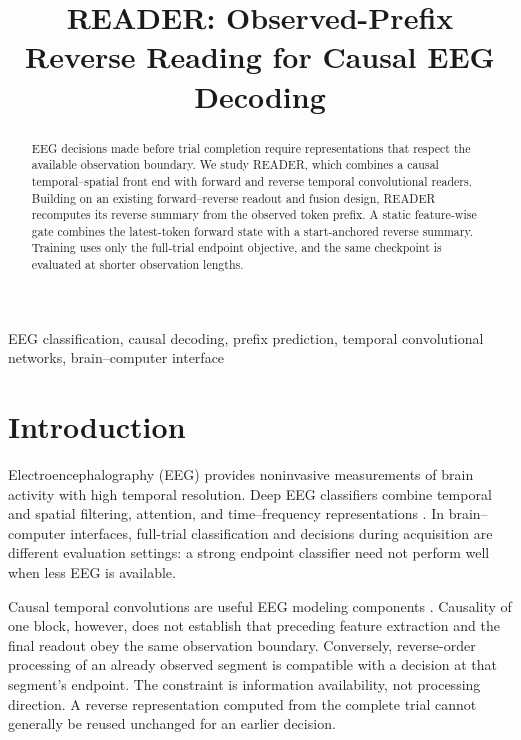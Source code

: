 \documentclass[conference]{IEEEtran}
\begin{document}
\title{READER: Observed-Prefix Reverse Reading for Causal EEG Decoding}

\maketitle
\begin{abstract}
EEG decisions made before trial completion require representations that respect
the available observation boundary. We study READER, which combines a causal
temporal--spatial front end with forward and reverse temporal convolutional
readers. Building on an existing forward--reverse readout and fusion design,
READER recomputes its reverse summary from the observed token prefix. A static
feature-wise gate combines the latest-token forward state with a start-anchored
reverse summary. Training uses only the full-trial endpoint objective, and the
same checkpoint is evaluated at shorter observation lengths.

\end{abstract}
\begin{IEEEkeywords}
EEG classification, causal decoding, prefix prediction, temporal convolutional networks, brain--computer interface
\end{IEEEkeywords}

\section{Introduction}
Electroencephalography (EEG) provides noninvasive measurements of brain activity
with high temporal resolution. Deep EEG classifiers combine temporal and spatial
filtering, attention, and time--frequency representations
\cite{lawhern2018eegnet,altaheri2022physics,song2022eeg,hong2025bidirectional}.
In brain--computer interfaces, full-trial classification and decisions during
acquisition are different evaluation settings: a strong endpoint classifier
need not perform well when less EEG is available.

Causal temporal convolutions are useful EEG modeling components
\cite{salami2022eeg}. Causality of one block, however, does not establish that
preceding feature extraction and the final readout obey the same observation
boundary. Conversely, reverse-order processing of an already observed segment
is compatible with a decision at that segment's endpoint. The constraint is
information availability, not processing direction. A reverse representation
computed from the complete trial cannot generally be reused unchanged for an
earlier decision.
\end{document}
